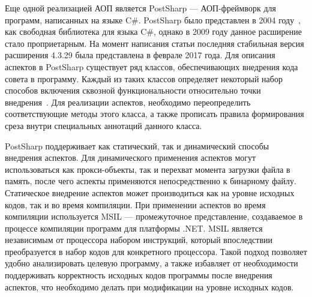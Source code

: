 \documentclass[conference]{IEEEtran}
\begin{document}
Еще одной реализацией АОП является PostSharp --- АОП-фреймворк для программ, 
написанных на языке C\#.
PostSharp было представлен в 2004 году~\cite{postsharp_doc}, как свободная
библиотека для языка C\#, однако в 2009 году данное расширение стало
проприетарным.
На момент написания статьи последняя стабильная версия расширения 4.3.29 была
представлена в феврале 2017 года.
Для описания аспектов в PostSharp существует ряд классов, обеспечивающих
внедрения кода совета в программу.
Каждый из таких классов определяет некоторый набор способов включения сквозной
функциональности относительно точки внедрения~\cite{postsharp_aspects}.
Для реализации аспектов, необходимо переопределить соответствующие методы этого
класса, а также прописать правила формирования среза внутри специальных
аннотаций данного класса.

PostSharp поддерживает как статический, так и динамический способы внедрения
аспектов.
Для динамического применения аспектов могут использоваться как прокси-объекты,
так и перехват момента загрузки файла в память, после чего аспекты применяются
непосредственно к бинарному файлу.
Статическое внедрение аспектов может производиться как на уровне исходных кодов,
так и во время компиляции.
При применении аспектов во время компиляции используется MSIL --- промежуточное
представление, создаваемое в процессе компиляции программ для платформы .NET.
MSIL является независимым от процессора набором инструкций, который впоследствии
преобразуется в набор кодов для конкретного процессора.
Такой подход позволяет удобно анализировать целевую программу, а также
избавляет от необходимости поддерживать корректность исходных кодов программы
после внедрения аспектов, что необходимо делать при модификации на уровне
исходных кодов.
\end{document}
